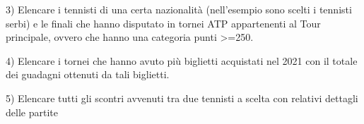 \documentclass[10pt]{article}
\newcommand{\spazia}{\par\medskip}
\begin{document}
3) Elencare i tennisti di una certa nazionalità (nell'esempio sono scelti i tennisti serbi) e le finali che hanno disputato in tornei ATP appartenenti al Tour principale, ovvero che hanno una categoria punti >=250.

\begin{figure}[h]
\end{figure}
\pagebreak

4) Elencare i tornei che hanno avuto più biglietti acquistati nel 2021 con il totale dei guadagni ottenuti da tali biglietti. \spazia \spazia 

\begin{figure}[h]
\end{figure}
\spazia \spazia \spazia  \spazia 

5) Elencare tutti gli scontri avvenuti tra due tennisti a scelta con relativi dettagli delle partite \spazia \spazia 
\end{document}
